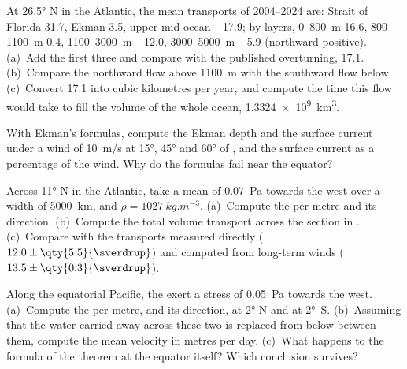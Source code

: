 \begin{exercise}[$\star$]\label{exo:b1:ocean-circulation:3}
At \ang{26.5} N in the Atlantic, the mean transports of 2004--2024 are: Strait of
Florida \qty{31.7}{\sverdrup}, Ekman \qty{3.5}{\sverdrup}, upper mid-ocean
\qty{-17.9}{\sverdrup}; by layers, 0--\qty{800}{m} \qty{16.6}{\sverdrup},
800--\qty{1100}{m} \qty{0.4}{\sverdrup}, 1100--\qty{3000}{m} \qty{-12.0}{\sverdrup},
3000--\qty{5000}{m} \qty{-5.9}{\sverdrup} (northward positive). (a)~Add the first
three and compare with the published overturning, \qty{17.1}{\sverdrup}. (b)~Compare
the northward flow above \qty{1100}{m} with the southward flow below. (c)~Convert
\qty{17.1}{\sverdrup} into cubic kilometres per year, and compute the time this flow
would take to fill the volume of the whole ocean, \qty{1.3324e9}{km^3}.
\end{exercise}

\begin{exercise}[$\star$]\label{exo:b1:ocean-circulation:4}
With Ekman's formulas, compute the Ekman depth and the surface current under a wind
of \qty{10}{m/s} at \ang{15}, \ang{45} and \ang{60} of , and the surface
current as a percentage of the wind. Why do the formulas fail near the equator?
\end{exercise}

\begin{exercise}[$\star\star$]\label{exo:b1:ocean-circulation:5}
Across \ang{11} N in the Atlantic, take a mean  of \qty{0.07}{Pa} towards
the west over a width of \qty{5000}{km}, and $\rho = \qty{1027}{kg.m^{-3}}$.
(a)~Compute the  per metre and its direction. (b)~Compute the total
volume transport across the section in . (c)~Compare with the transports
measured directly ($12.0 \pm \qty{5.5}{\sverdrup}$) and computed from long-term
winds ($13.5 \pm \qty{0.3}{\sverdrup}$).
\end{exercise}

\begin{exercise}[$\star\star$]\label{exo:b1:ocean-circulation:6}
Along the equatorial Pacific, the  exert a stress of \qty{0.05}{Pa}
towards the west. (a)~Compute the  per metre, and its direction, at
\ang{2} N and at \ang{2}~S. (b)~Assuming that the water carried away across these two
 is replaced from below between them, compute the mean  velocity
in metres per day. (c)~What happens to the formula of the theorem at the equator
itself? Which conclusion survives?
\end{exercise}

